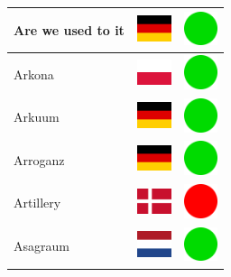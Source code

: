\documentclass[12pt, a4paper, twoside]{report}
\begin{document}
\begin{center}
\begin{longtable}{|p{5cm}|p{2cm}|p{2cm}|}
 Are we used to it                                          & \includegraphics[width=1cm]{../img/flags/de} &   \includegraphics[width=1cm]{../likes/y} \\ \hline
 Arkona                                                     & \includegraphics[width=1cm]{../img/flags/pl} &   \includegraphics[width=1cm]{../likes/y} \\ \hline
 Arkuum                                                     & \includegraphics[width=1cm]{../img/flags/de} &   \includegraphics[width=1cm]{../likes/y} \\ \hline
 Arroganz                                                   & \includegraphics[width=1cm]{../img/flags/de} &   \includegraphics[width=1cm]{../likes/y} \\ \hline
 Artillery                                                  & \includegraphics[width=1cm]{../img/flags/dk} &   \includegraphics[width=1cm]{../likes/n} \\ \hline
 Asagraum                                                   & \includegraphics[width=1cm]{../img/flags/nl} &   \includegraphics[width=1cm]{../likes/y} \\ \hline

\end{longtable}
\end{center}
\end{document}
